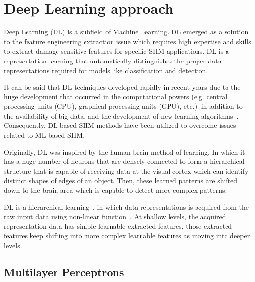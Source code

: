 \section{Deep Learning approach}
\label{sec32}

Deep Learning (DL) is a subfield of Machine Learning.
DL emerged as a solution to the feature engineering extraction issue which requires high expertise and skills to extract damage-sensitive features for specific SHM applications.
DL is a representation learning that automatically distinguishes  the proper data representations required for models like classification and detection.

It can be said that DL techniques developed rapidly in recent years due to the huge development that occurred in the computational powers (e.g. central processing units (CPU), graphical processing units (GPU), etc.), in addition to the availability of big data, and the development of new learning algorithms~\cite{Yuan2020}.
Consequently, DL-based SHM methods have been utilized to overcome issues related to ML-based SHM.
  
Originally, DL was inspired by the human brain method of learning. 
In which it has a huge number of neurons that are densely connected to form a hierarchical structure that is capable of receiving data at the visual cortex which can identify distinct shapes of edges of an object.
Then, these learned patterns  are shifted down to the brain area which is capable to detect more complex patterns. 

DL is a hierarchical learning~\cite{Ongsulee2018}, in which
data representations is acquired from the raw input data using non-linear function~\cite{Lecun2015}. 
At shallow levels, the acquired representation data has simple learnable extracted features, those extracted features keep shifting into more complex learnable features as moving into deeper levels.

\subsection{Multilayer Perceptrons}

